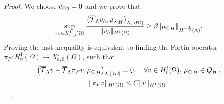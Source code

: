 \documentclass[r]{siamart171218}
\begin{document}
\begin{proof}
We choose $v_{\odot \mathfrak{h}}=0$ and we prove that
\begin{equation*} 
\sup_{v_h \in X_{h,0}^1(\Omega)} \frac{\left({\overline{\mathcal{T}}_\Lambda} v_h ,{\mu_{\odot}}_H\right)_{\Lambda, |\partial\mathcal{D}|}}{\|v_h\|_{H^1(\Omega)}} \geq \beta \|{\mu_{\odot}}_H\|_{H^{-\frac 12}(\Lambda)}.
\end{equation*} 
Proving the last inequality is equivalent to finding the Fortin operator $\pi_F: H^1_0(\Omega) \rightarrow X_{h,0}^1(\Omega)$, such that 
\begin{gather}
\left(\mtrace v - \mtrace \pi _F v  , {\md}_H\right)_{\Lambda, |\DD|}=0, \quad \forall v\in H^1_0(\Omega), \, {\md}_H \in Q_H\,,
\\
\label{eq:cont_Fortin}
\|\pi_F v\|_{H^1(\Omega)} \leq C \|v\|_{H^1(\Omega)}\,.
\end{gather} 


\end{proof}
\end{document}
